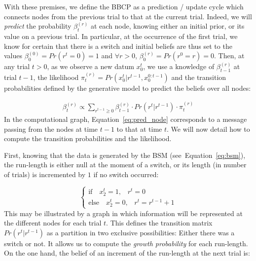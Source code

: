 \documentclass[10pt,letterpaper]{article}
\newcommand{\choice}[1]{ %
	\left\{ %
		\begin{array}{l} #1 \end{array} %
	\right. }
\newcommand{\eql}[1]{\begin{equation}#1\end{equation}}
\newcommand{\eqa}[1]{\begin{align}#1\end{align}}
\newcommand{\Ll}{\mathcal{L}}
\newcommand{\seeFig}[1]{Figure~\ref{fig:#1}}
\newcommand{\seeEq}[1]{Equation~\ref{eq:#1}}
\begin{document}
With these premises, we define the BBCP
as a prediction / update cycle
which connects nodes from the previous trial to that at the current trial.
Indeed, we will \emph{predict} the probability
$\beta^{(r)}_t$ at each node, knowing either an initial prior, or its value on a previous trial.
In particular, at the occurrence of the first trial, we know for certain that there is a switch and
initial beliefs are thus set to the values $\beta^{(0)}_0=Pr(r^t=0)=1$ and
$\forall r>0$, $\beta^{(r)}_0=Pr(r^0=r)=0$.
Then, at any trial $t>0$, as we observe a new datum $x_0^t$,
we use a knowledge of $\beta^{(r)}_{t-1}$ at trial $t-1$,
the likelihood $\pi^{(r)}_{t}=Pr(x_0^{t} | r^{t-1}, x_0^{0:t-1})$  and
the transition probabilities defined by the generative model
to predict the beliefs over all nodes: %

\eqa{
\beta^{(r)}_t \propto \sum_{r^{t-1} \geq 0} \beta^{(r)}_{t-1} \cdot Pr(r^t | r^{t-1}) \cdot  \pi^{(r)}_{t}
\label{eq:pred_node}
}
In the computational graph, %
\seeEq{pred_node} corresponds to a message passing from the nodes at time $t-1$
to that at time $t$. %
We will now detail how to compute the transition probabilities and the likelihood.

First, knowing that the data is generated by the BSM (see~\seeEq{bsm}),
the run-length is either null at the moment of a switch,
or its length (in number of trials) is incremented by $1$ if no switch occurred:

\eql{\choice{
\text{if} \quad x_2^t=1 \text{,} \quad r^t = 0\\
\text{else} \quad x_2^t=0 \text{,} \quad r^t = r^{t-1} +1 }\label{eq:run_length}}%
This may be illustrated by a graph
in which information will be represented at the different nodes for each trial $t$.
This defines the transition matrix $Pr(r^t | r^{t-1})$
as a partition in two exclusive possibilities:
Either there was a switch or not.
It allows us to compute the \emph{growth probability} for each run-length. %
On the one hand, the belief of an increment of the run-length at the next trial is: %
\end{document}
